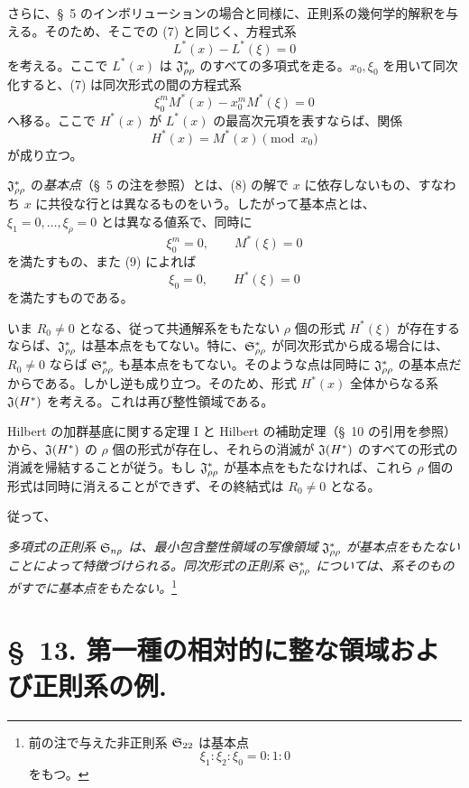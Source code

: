 \documentclass[11pt]{article}
\begin{document}
さらに、\S\ 5 のインボリューションの場合と同様に、正則系の幾何学的解釈を与える。そのため、そこでの (7) と同じく、方程式系
\begin{equation}
  L^*(x)-L^*(\xi)=0
\tag{7}
\end{equation}
を考える。ここで $L^*(x)$ は $\mathfrak{J}^*_{\rho\rho}$ のすべての多項式を走る。$x_0,\xi_0$ を用いて同次化すると、(7) は同次形式の間の方程式系
\begin{equation}
  \xi_0^{m}M^*(x)-x_0^{m}M^*(\xi)=0
\tag{8}
\end{equation}
へ移る。ここで $H^*(x)$ が $L^*(x)$ の最高次元項を表すならば、関係
\begin{equation}
  H^*(x)=M^*(x)\pmod{x_0}
\tag{9}
\end{equation}
が成り立つ。

$\mathfrak{J}^*_{\rho\rho}$ の\emph{基本点}（\S\ 5 の注を参照）とは、(8) の解で $x$ に依存しないもの、すなわち $x$ に共役な行とは異なるものをいう。したがって基本点とは、$\xi_1=0,\ldots,\xi_\rho=0$ とは異なる値系で、同時に
\[
  \xi_0^m=0,
  \qquad M^*(\xi)=0
\]
を満たすもの、また (9) によれば
\[
  \xi_0=0,
  \qquad H^*(\xi)=0
\]
を満たすものである。

いま $R_0\ne0$ となる、従って共通解系をもたない $\rho$ 個の形式 $H^*(\xi)$ が存在するならば、$\mathfrak{J}^*_{\rho\rho}$ は基本点をもてない。特に、$\mathfrak{S}^*_{\rho\rho}$ が同次形式から成る場合には、$R_0\ne0$ ならば $\mathfrak{S}^*_{\rho\rho}$ も基本点をもてない。そのような点は同時に $\mathfrak{J}^*_{\rho\rho}$ の基本点だからである。しかし逆も成り立つ。そのため、形式 $H^*(x)$ 全体からなる系 $\mathfrak{J}(H^*)$ を考える。これは再び整性領域である。

Hilbert の加群基底に関する定理 I と Hilbert の補助定理（\S\ 10 の引用を参照）から、$\mathfrak{J}(H^*)$ の $\rho$ 個の形式が存在し、それらの消滅が $\mathfrak{J}(H^*)$ のすべての形式の消滅を帰結することが従う。もし $\mathfrak{J}^*_{\rho\rho}$ が基本点をもたなければ、これら $\rho$ 個の形式は同時に消えることができず、その終結式は $R_0\ne0$ となる。

従って、

\emph{多項式の正則系 $\mathfrak{S}_{n\rho}$ は、最小包含整性領域の写像領域 $\mathfrak{J}^*_{\rho\rho}$ が基本点をもたないことによって特徴づけられる。同次形式の正則系 $\mathfrak{S}^*_{\rho\rho}$ については、系そのものがすでに基本点をもたない。}\footnote{前の注で与えた非正則系 $\mathfrak{S}_{22}$ は基本点
\[
  \xi_1:\xi_2:\xi_0=0:1:0
\]
をもつ。}

\section*{\S\ 13. 第一種の相対的に整な領域および正則系の例.}
\end{document}
